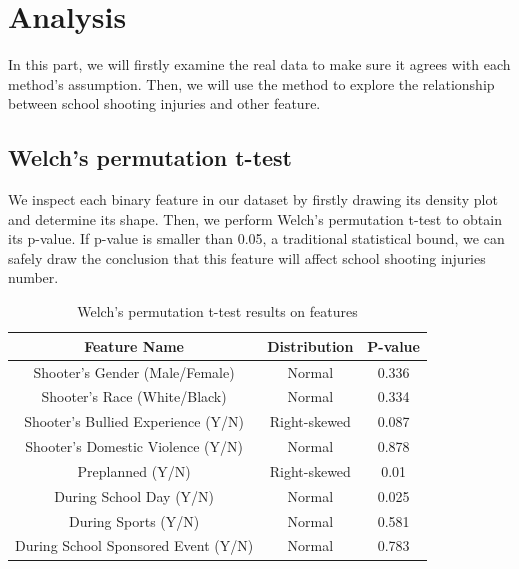 \documentclass[12pt]{article}
\numberwithin{figure}{section}
\begin{document}
\section{Analysis}

 In this part, we will firstly examine the real data to make sure it agrees with each method's assumption. Then, we will use the method to explore the relationship between school shooting injuries and other feature.

\subsection{Welch’s permutation t-test}

We inspect each binary feature in our dataset by firstly drawing its density plot and determine its shape. Then, we perform Welch’s permutation t-test to obtain its p-value. If p-value is smaller than 0.05, a traditional statistical bound, we can safely draw the conclusion that this feature will affect school shooting injuries number.

\begin{table}[H]
\centering
\begin{tabular}{|c|c|c|}
\hline
Feature Name                        & Distribution & P-value                       \\ \hline
Shooter's Gender (Male/Female)      & Normal       & 0.336                         \\ \hline
Shooter's Race (White/Black)        & Normal       & 0.334                         \\ \hline
Shooter's Bullied Experience (Y/N)  & Right-skewed & 0.087                         \\ \hline
Shooter's Domestic Violence (Y/N)   & Normal       & 0.878                         \\ \hline
Preplanned (Y/N)                    & Right-skewed & 0.01  
\\ \hline
During School Day (Y/N)             & Normal       & 0.025 
\\ \hline
During Sports (Y/N)                 & Normal       & 0.581                         \\ \hline
During School Sponsored Event (Y/N) & Normal       & 0.783                         \\ \hline
\end{tabular}
\caption{Welch’s permutation t-test results on features}
\label{perm_result_table}
\end{table}
\end{document}
